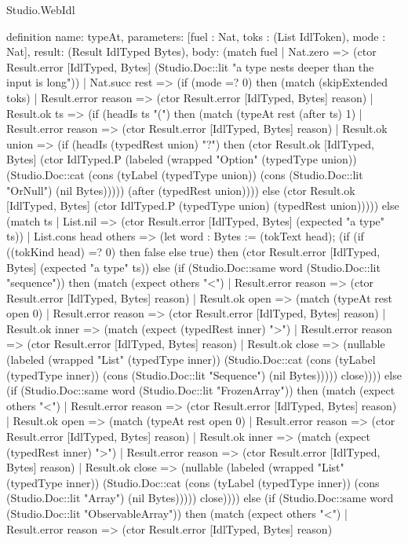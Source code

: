 \begin{lexlean}{Studio.WebIdl}
\begin{semanticmodule}
definition{
  name: typeAt,
  parameters: [fuel : Nat, toks : (List IdlToken), mode : Nat],
  result: (Result IdlTyped Bytes),
  body: (match fuel
    | Nat.zero => (ctor Result.error [IdlTyped, Bytes] (Studio.Doc::lit "a type nests deeper than the input is long"))
    | Nat.succ rest => (if (mode =? 0) then (match (skipExtended toks)
    | Result.error reason => (ctor Result.error [IdlTyped, Bytes] reason)
    | Result.ok ts => (if (headIs ts "(") then (match (typeAt rest (after ts) 1)
    | Result.error reason => (ctor Result.error [IdlTyped, Bytes] reason)
    | Result.ok union => (if (headIs (typedRest union) "?") then (ctor Result.ok [IdlTyped, Bytes] (ctor IdlTyped.P (labeled (wrapped "Option" (typedType union)) (Studio.Doc::cat (cons (tyLabel (typedType union)) (cons (Studio.Doc::lit "OrNull") (nil Bytes))))) (after (typedRest union)))) else (ctor Result.ok [IdlTyped, Bytes] (ctor IdlTyped.P (typedType union) (typedRest union))))) else (match ts
    | List.nil => (ctor Result.error [IdlTyped, Bytes] (expected "a type" ts))
    | List.cons head others => (let word : Bytes := (tokText head); (if (if ((tokKind head) =? 0) then false else true) then (ctor Result.error [IdlTyped, Bytes] (expected "a type" ts)) else (if (Studio.Doc::same word (Studio.Doc::lit "sequence")) then (match (expect others "<")
    | Result.error reason => (ctor Result.error [IdlTyped, Bytes] reason)
    | Result.ok open => (match (typeAt rest open 0)
    | Result.error reason => (ctor Result.error [IdlTyped, Bytes] reason)
    | Result.ok inner => (match (expect (typedRest inner) ">")
    | Result.error reason => (ctor Result.error [IdlTyped, Bytes] reason)
    | Result.ok close => (nullable (labeled (wrapped "List" (typedType inner)) (Studio.Doc::cat (cons (tyLabel (typedType inner)) (cons (Studio.Doc::lit "Sequence") (nil Bytes))))) close)))) else (if (Studio.Doc::same word (Studio.Doc::lit "FrozenArray")) then (match (expect others "<")
    | Result.error reason => (ctor Result.error [IdlTyped, Bytes] reason)
    | Result.ok open => (match (typeAt rest open 0)
    | Result.error reason => (ctor Result.error [IdlTyped, Bytes] reason)
    | Result.ok inner => (match (expect (typedRest inner) ">")
    | Result.error reason => (ctor Result.error [IdlTyped, Bytes] reason)
    | Result.ok close => (nullable (labeled (wrapped "List" (typedType inner)) (Studio.Doc::cat (cons (tyLabel (typedType inner)) (cons (Studio.Doc::lit "Array") (nil Bytes))))) close)))) else (if (Studio.Doc::same word (Studio.Doc::lit "ObservableArray")) then (match (expect others "<")
    | Result.error reason => (ctor Result.error [IdlTyped, Bytes] reason)
}
\end{semanticmodule}
\end{lexlean}
